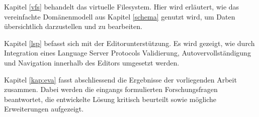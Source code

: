 Kapitel \ref{vfs}  behandelt das virtuelle Filesystem. Hier wird erläutert, wie das vereinfachte Domänenmodell aus Kapitel \ref{schema} genutzt wird, um Daten übersichtlich darzustellen und zu bearbeiten.

Kapitel \ref{lsp} befasst sich mit der Editorunterstützung. Es wird gezeigt, wie durch Integration eines Language Server Protocols Validierung, Autovervollständigung und Navigation innerhalb des Editors umgesetzt werden.

Kapitel \ref{kap:eva} fasst abschliessend die Ergebnisse der vorliegenden Arbeit zusammen. Dabei werden die eingangs formulierten Forschungsfragen beantwortet, die entwickelte Lösung kritisch beurteilt sowie mögliche Erweiterungen aufgezeigt.




